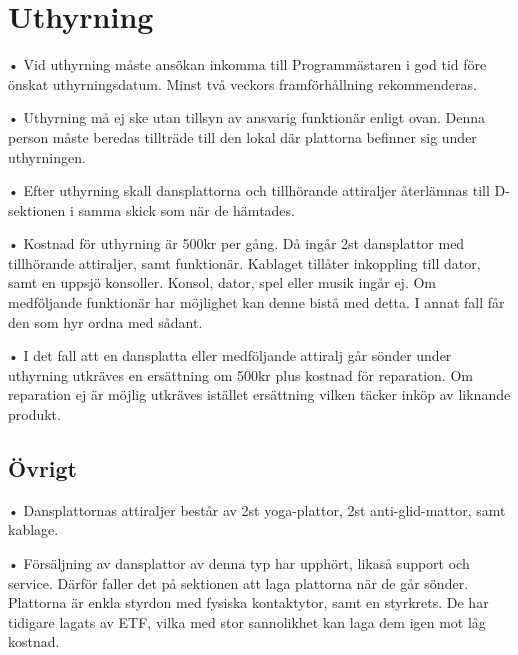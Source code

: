 \documentclass{dsekprotokoll}
\begin{document}
\section{Uthyrning}
• Vid uthyrning måste ansökan inkomma till Programmästaren i god tid före önskat uthyrningsdatum. Minst två veckors framförhållning rekommenderas.

• Uthyrning må ej ske utan tillsyn av ansvarig funktionär enligt ovan. Denna person måste beredas tillträde till den lokal där plattorna befinner sig under uthyrningen.

• Efter uthyrning skall dansplattorna och tillhörande attiraljer återlämnas till D-sektionen
i samma skick som när de hämtades.

• Kostnad för uthyrning är 500kr per gång. Då ingår 2st dansplattor med tillhörande attiraljer, samt funktionär. Kablaget tillåter inkoppling till dator, samt en uppsjö konsoller.
Konsol, dator, spel eller musik ingår ej. Om medföljande funktionär har möjlighet kan
denne bistå med detta. I annat fall får den som hyr ordna med sådant.

• I det fall att en dansplatta eller medföljande attiralj går sönder under uthyrning utkräves
en ersättning om 500kr plus kostnad för reparation. Om reparation ej är möjlig utkräves
istället ersättning vilken täcker inköp av liknande produkt.

\subsection{Övrigt}

• Dansplattornas attiraljer består av 2st yoga-plattor, 2st anti-glid-mattor, samt kablage.

• Försäljning av dansplattor av denna typ har upphört, likaså support och service. Därför
faller det på sektionen att laga plattorna när de går sönder. Plattorna är enkla styrdon
med fysiska kontaktytor, samt en styrkrets. De har tidigare lagats av ETF, vilka med stor
sannolikhet kan laga dem igen mot låg kostnad.
\end{document}
